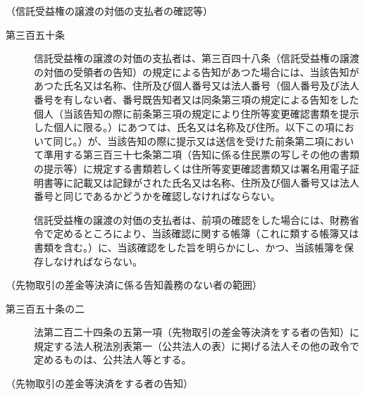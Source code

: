 \documentclass[twocolumn,a4j,10pt]{ltjtarticle}
\begin{document}
\noindent\hspace{10pt}（信託受益権の譲渡の対価の支払者の確認等）
\begin{description}
\item[第三百五十条]信託受益権の譲渡の対価の支払者は、第三百四十八条（信託受益権の譲渡の対価の受領者の告知）の規定による告知があつた場合には、当該告知があつた氏名又は名称、住所及び個人番号又は法人番号（個人番号及び法人番号を有しない者、番号既告知者又は同条第三項の規定による告知をした個人（当該告知の際に前条第三項の規定により住所等変更確認書類を提示した個人に限る。）にあつては、氏名又は名称及び住所。以下この項において同じ。）が、当該告知の際に提示又は送信を受けた前条第二項において準用する第三百三十七条第二項（告知に係る住民票の写しその他の書類の提示等）に規定する書類若しくは住所等変更確認書類又は署名用電子証明書等に記載又は記録がされた氏名又は名称、住所及び個人番号又は法人番号と同じであるかどうかを確認しなければならない。
\item[]信託受益権の譲渡の対価の支払者は、前項の確認をした場合には、財務省令で定めるところにより、当該確認に関する帳簿（これに類する帳簿又は書類を含む。）に、当該確認をした旨を明らかにし、かつ、当該帳簿を保存しなければならない。
\end{description}
\noindent\hspace{10pt}（先物取引の差金等決済に係る告知義務のない者の範囲）
\begin{description}
\item[第三百五十条の二]法第二百二十四条の五第一項（先物取引の差金等決済をする者の告知）に規定する法人税法別表第一（公共法人の表）に掲げる法人その他の政令で定めるものは、公共法人等とする。
\end{description}
\noindent\hspace{10pt}（先物取引の差金等決済をする者の告知）
\end{document}
